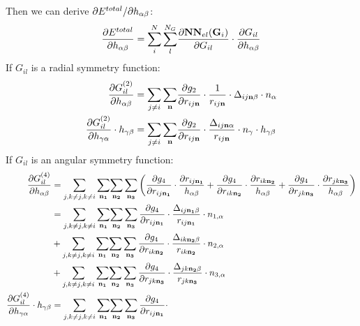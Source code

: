 \documentclass[prb,preprint]{revtex4-2}
\begin{document}
{Then we can derive $\partial E^{total} / \partial h_{\alpha\beta}$:
\begin{align}
\label{eq:dEdhab}
\frac{\partial E^{total}}{\partial h_{\alpha\beta}} = \sum_{i}^{N}{\sum_{l}^{N_G}}{
    \frac{\partial \mathbf{NN}_{el}(\mathbf{G}_i)}{\partial G_{il}}
    \cdot
    \frac{\partial G_{il}}{\partial h_{\alpha\beta}}
}
\end{align}
If $G_{il}$ is a radial symmetry function:
\begin{align}
\frac{\partial G_{il}^{(2)}}{\partial h_{\alpha\beta}} 
& = \sum_{j \neq i}{\sum_{\mathbf{n}}}{
    \frac{\partial g_2}{\partial r_{ij\mathbf{n}}} 
    \cdot 
    \frac{1}{r_{ij\mathbf{n}}} \cdot \Delta_{ij\mathbf{n}\beta} \cdot n_{\alpha}
} \\
\label{eq:stress_g2_right}
\frac{\partial G_{il}^{(2)}}{\partial h_{\gamma\alpha}} \cdot h_{\gamma\beta} & = 
\sum_{j \neq i}{\sum_{\mathbf{n}}}{
    \frac{\partial g_2}{\partial r_{ij\mathbf{n}}} 
    \cdot 
    \frac{\Delta_{ij\mathbf{n}\alpha}}{r_{ij\mathbf{n}}} \cdot n_{\gamma}
} \cdot h_{\gamma\beta}
\end{align}
If $G_{il}$ is an angular symmetry function:
\begin{align}
\frac{\partial G_{il}^{(4)}}{\partial h_{\alpha\beta}} & =
    \sum_{j, k \neq j, k \neq i}{
        \sum_{\mathbf{n_1}}}{\sum_{\mathbf{n_2}}{\sum_{\mathbf{n_3}}{
    \left(
        \frac{\partial g_4}{\partial r_{ij\mathbf{n_1}}}\cdot\frac{\partial r_{ij\mathbf{n_1}}}{h_{\alpha\beta}} +
        \frac{\partial g_4}{\partial r_{ik\mathbf{n_2}}}\cdot\frac{\partial r_{ik\mathbf{n_2}}}{h_{\alpha\beta}} +
        \frac{\partial g_4}{\partial r_{jk\mathbf{n_3}}}\cdot\frac{\partial r_{jk\mathbf{n_3}}}{h_{\alpha\beta}}
    \right)
}}} \nonumber \\
& =  \sum_{j, k \neq j, k \neq i}{
        \sum_{\mathbf{n_1}}}{\sum_{\mathbf{n_2}}{\sum_{\mathbf{n_3}}{
    \frac{\partial g_4}{\partial r_{ij\mathbf{n_1}}} \cdot 
    \frac{\Delta_{ij\mathbf{n_1}\beta}}{r_{ij\mathbf{n_1}}} \cdot n_{1,\alpha}
}}} \nonumber \\
& + \sum_{j, k \neq j, k \neq i}{
    \sum_{\mathbf{n_1}}}{\sum_{\mathbf{n_2}}{\sum_{\mathbf{n_3}}{
\frac{\partial g_4}{\partial r_{ik\mathbf{n_2}}} \cdot 
\frac{\Delta_{ik\mathbf{n_2}\beta}}{r_{ik\mathbf{n_2}}} \cdot n_{2,\alpha}
}}} \nonumber \\
& + \sum_{j, k \neq j, k \neq i}{
    \sum_{\mathbf{n_1}}}{\sum_{\mathbf{n_2}}{\sum_{\mathbf{n_3}}{
\frac{\partial g_4}{\partial r_{jk\mathbf{n_3}}} \cdot 
\frac{\Delta_{jk\mathbf{n_2}\beta}}{r_{jk\mathbf{n_3}}} \cdot n_{3,\alpha}
}}} \\
\label{eq:stress_g4_right}
\frac{\partial G_{il}^{(4)}}{\partial h_{\gamma\alpha}} \cdot h_{\gamma\beta} & = 
\sum_{j, k \neq j, k \neq i}{
    \sum_{\mathbf{n_1}}}{\sum_{\mathbf{n_2}}{\sum_{\mathbf{n_3}}{
\frac{\partial g_4}{\partial r_{ij\mathbf{n_1}}} \cdot 
}}}
\end{align}}
\end{document}
